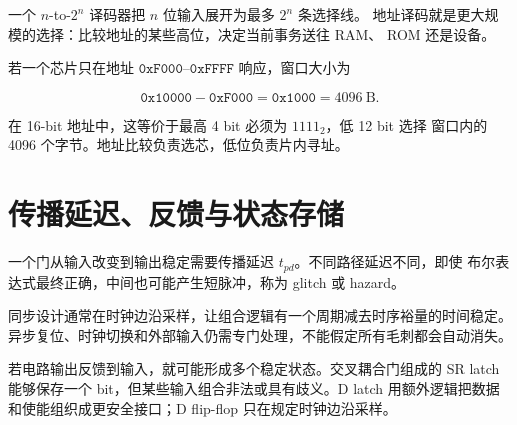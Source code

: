 一个 \(n\)-to-\(2^n\) 译码器把 \(n\) 位输入展开为最多 \(2^n\) 条选择线。
地址译码就是更大规模的选择：比较地址的某些高位，决定当前事务送往 RAM、
ROM 还是设备。

\begin{workedexample}
若一个芯片只在地址 \(\texttt{0xF000}\)--\(\texttt{0xFFFF}\) 响应，窗口大小为

\[
\texttt{0x10000}-\texttt{0xF000}=\texttt{0x1000}=4096\ \mathrm{B}.
\]

在 16-bit 地址中，这等价于最高 4 bit 必须为 \(1111_2\)，低 12 bit 选择
窗口内的 4096 个字节。地址比较负责选芯，低位负责片内寻址。
\end{workedexample}



\section{传播延迟、反馈与状态存储}

\mustunderstand
一个门从输入改变到输出稳定需要传播延迟 \(t_{pd}\)。不同路径延迟不同，即使
布尔表达式最终正确，中间也可能产生短脉冲，称为 glitch 或 hazard。

\begin{center}
\end{center}

同步设计通常在时钟边沿采样，让组合逻辑有一个周期减去时序裕量的时间稳定。
异步复位、时钟切换和外部输入仍需专门处理，不能假定所有毛刺都会自动消失。

若电路输出反馈到输入，就可能形成多个稳定状态。交叉耦合门组成的 SR latch
能够保存一个 bit，但某些输入组合非法或具有歧义。D latch 用额外逻辑把数据
和使能组织成更安全接口；D flip-flop 只在规定时钟边沿采样。

